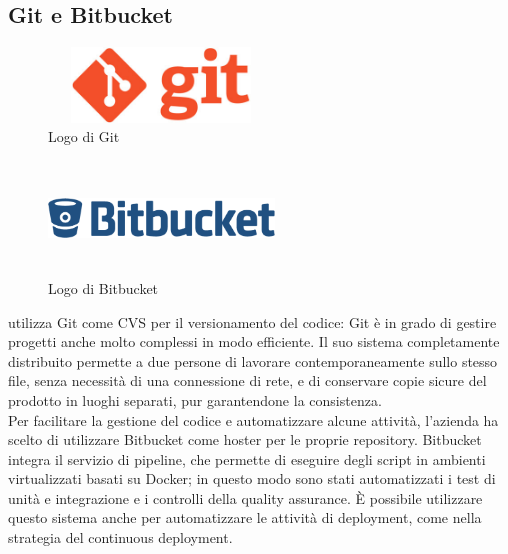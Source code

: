   \subsection{Git e Bitbucket}
   \begin{figure}[H]
      \begin{center}
         \includegraphics[width=6cm,height=2cm,keepaspectratio]{immagini/git-logo}
      \end{center}
      \caption{Logo di Git}\label{logogit}
   \end{figure}
   \begin{figure}[H]
      \begin{center}
         \includegraphics[width=6cm,height=3cm,keepaspectratio]{immagini/bitbucket-logo}
      \end{center}
      \caption{Logo di Bitbucket}\label{logobitbucket}
   \end{figure}
   \nomeAzienda{} utilizza Git come \gls{CVS} per il versionamento del codice: Git è in grado di gestire progetti anche molto complessi in modo efficiente. Il suo sistema completamente distribuito permette a due persone di lavorare contemporaneamente sullo stesso file, senza necessità di una connessione di rete, e di conservare copie sicure del prodotto in luoghi separati, pur garantendone la consistenza.\\
   Per facilitare la gestione del codice e automatizzare alcune attività, l'azienda ha scelto di utilizzare Bitbucket come hoster per le proprie repository. Bitbucket integra il servizio di pipeline, che permette di eseguire degli script in ambienti virtualizzati basati su Docker; in questo modo sono stati automatizzati i test di unità e integrazione e i controlli della quality assurance. È possibile utilizzare questo sistema anche per automatizzare le attività di deployment, come nella strategia del continuous deployment.

